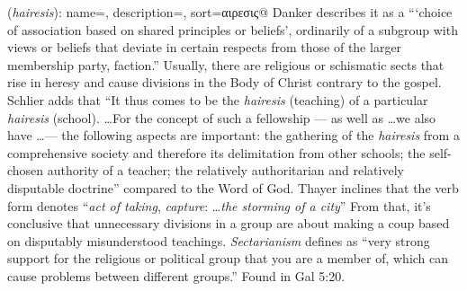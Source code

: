 \item[Sectarianism,]

(\textit{hairesis}):
{
    name=,
    description={},
    sort=αιρεσις@
}
Danker describes it as a ```choice of association based on shared principles or beliefs', ordinarily of a subgroup with views or beliefs that deviate in certain respects from those of the larger membership party, faction.'' Usually, there are religious or schismatic sects that rise in heresy and cause divisions in the Body of Christ contrary to the gospel. Schlier adds that ``It thus comes to be the \emph{hairesis} (teaching) of a particular \emph{hairesis} (school). \ldots For the concept of such a fellowship --- as well as \ldots we also have \ldots --- the following aspects are important: the gathering of the \emph{hairesis} from a comprehensive society and therefore its delimitation from other schools; the self-chosen authority of a teacher; the relatively authoritarian and relatively disputable doctrine'' compared to the Word of God. 
Thayer inclines that the verb form  denotes ``\emph{act of taking}, \emph{capture}: \ldots \emph{the storming of a city}'' From that, it's conclusive that unnecessary divisions in a group are about making a coup based on disputably misunderstood teachings. \emph{Sectarianism} defines as ``very strong support for the religious or political group that you are a member of, which can cause problems between different groups.''
Found in Gal 5:20.



